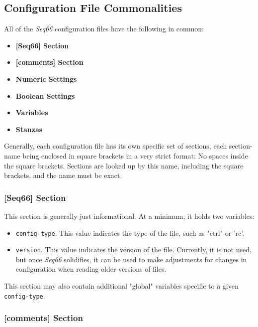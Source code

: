 \subsection{Configuration File Commonalities}
\label{subsec:configuration_file_commonalities}

   All of the \textsl{Seq66} configuration files have the following in common:

   \begin{itemize}
      \item \textbf{[Seq66] Section}
      \item \textbf{[comments] Section}
      \item \textbf{Numeric Settings}
      \item \textbf{Boolean Settings}
      \item \textbf{Variables}
      \item \textbf{Stanzas}
   \end{itemize}

   Generally, each configuration file has its own specific set
   of sections, each section-name being enclosed in square brackets in a very
   strict format:  No spaces inside the square brackets.  Sections are looked up
   by this name, including the square brackets, and the name must be exact.

\subsubsection{[Seq66] Section}
\label{subsec:configuration_common_seq66_section}

   This section is generally just informational.  At a minimum, it holds two
   variables:

   \begin{itemize}
      \item \texttt{config-type}.  This value indicates the type of the file,
      such as "ctrl" or 'rc'.
      \item \texttt{version}.  This value indicates the version of the file.
      Currently, it is not used, but once \textsl{Seq66} solidifies,
      it can be used to make adjustments for changes in configuration when
      reading older versions of files.
   \end{itemize}

   This section may also contain additional "global"
   variables specific to a given \texttt{config-type}.

\subsubsection{[comments] Section}
\label{subsec:configuration_common_comments_section}


